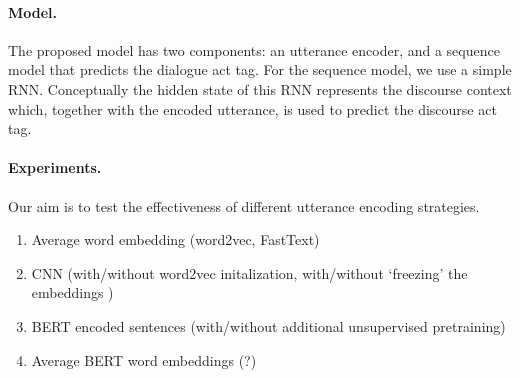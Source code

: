 \documentclass[11pt,a4paper,headings=standardclasses]{article}
\begin{document}
%

\paragraph{Model.}
The proposed model has two components: an utterance encoder, and a sequence model that predicts the dialogue act tag.
For the sequence model, we use a simple RNN.
Conceptually the hidden state of this RNN represents the discourse context which, 
together with the encoded utterance, is used to predict the discourse act tag.



\paragraph{Experiments.}
Our aim is to test the effectiveness of different utterance encoding strategies. 
\begin{enumerate}
  \item Average word embedding (word2vec, FastText)
  \item CNN (with/without word2vec initalization, with/without `freezing' the embeddings )
  \item BERT encoded sentences (with/without additional unsupervised pretraining)
  \item Average BERT word embeddings (?)
  \end{enumerate}
\end{document}

